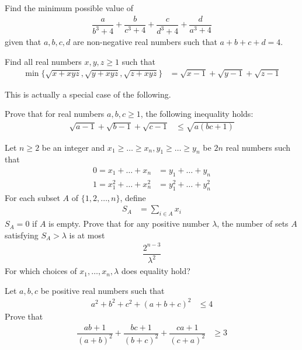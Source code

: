\documentclass{subfile}
\begin{document}
		\begin{problem}
			Find the minimum possible value of
				\begin{align*}
					\dfrac{a}{b^{3}+4}+\dfrac{b}{c^{3}+4}+\dfrac{c}{d^{3}+4}+\dfrac{d}{a^{3}+4}
				\end{align*}
			given that $a,b,c,d$ are non-negative real numbers such that $a+b+c+d=4$.
		\end{problem}
	
		\begin{problem}
			Find all real numbers $x,y,z\ge1$ such that
				\begin{align*}
					\min\{\sqrt{x+xyz},\sqrt{y+xyz},\sqrt{z+xyz}\}
						& = \sqrt{x-1}+\sqrt{y-1}+\sqrt{z-1}
				\end{align*}
		\end{problem}
	This is actually a special case of the following.
		\begin{problem}
			Prove that for real numbers $a,b,c\geq1$, the following inequality holds:
				\begin{align*}
					\sqrt{a-1}+\sqrt{b-1}+\sqrt{c-1}
						& \leq\sqrt{a(bc+1)}
				\end{align*}
		\end{problem}
	
		\begin{problem}
			Let $n\geq2$ be an integer and $x_{1}\geq\ldots\geq x_{n},y_{1}\geq\ldots\geq y_{n}$ be $2n$ real numbers such that
				\begin{align*}
					0 = x_{1}+\ldots+x_{n}
						& = y_{1}+\ldots+y_{n}\\
					1 = x_{1}^{2}+\ldots+x_{n}^{2}
						& = y_{1}^{2}+\ldots+y_{n}^{2}
				\end{align*}
			For each subset $A$ of $\{1,2,\ldots,n\}$, define
				\begin{align*}
					S_{A}
						& = \sum_{i\in A}x_{i}
				\end{align*}
			$S_{A}=0$ if $A$ is empty. Prove that for any positive number $\lambda$, the number of sets $A$ satisfying $S_{A}>\lambda$ is at most
				\begin{align*}
					\dfrac{2^{n-3}}{\lambda^{2}}
				\end{align*}
			For which choices of $x_{1},\ldots,x_{n},\lambda$ does equality hold?
		\end{problem}
	
		\begin{problem}
			Let $a,b,c$ be positive real numbers such that
				\begin{align*}
					a^{2}+b^{2}+c^{2}+(a+b+c)^{2}
						& \leq 4
				\end{align*}
			Prove that
				\begin{align*}
					\dfrac{ab+1}{(a+b)^{2}}+\dfrac{bc+1}{(b+c)^{2}}+\dfrac{ca+1}{(c+a)^{2}}
						& \geq3
				\end{align*}
		\end{problem}
	
\end{document}

